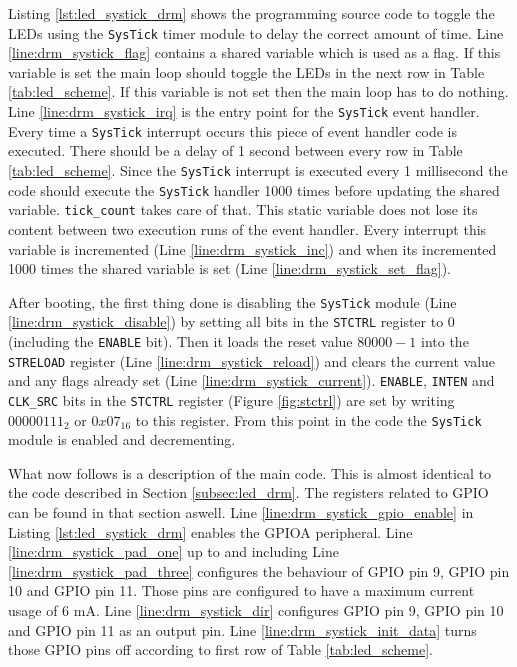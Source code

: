 Listing \ref{lst:led_systick_drm} shows the programming source code to toggle the LEDs using the \texttt{SysTick} timer module to delay the correct amount of time.
Line \ref{line:drm_systick_flag} contains a shared variable which is used as a flag. If this variable is set the main loop should toggle the LEDs in the next row in Table \ref{tab:led_scheme}. If this variable is not set then the main loop has to do nothing.
Line \ref{line:drm_systick_irq} is the entry point for the \texttt{SysTick} event handler.
Every time a \texttt{SysTick} interrupt occurs this piece of event handler code is executed.
There should be a delay of 1 second between every row in Table \ref{tab:led_scheme}. Since the \texttt{SysTick} interrupt is executed every 1 millisecond the code should execute the \texttt{SysTick} handler 1000 times before updating the shared variable.
\texttt{tick\_count} takes care of that. This static variable does not lose its content between two execution runs of the event handler.
Every interrupt this variable is incremented (Line \ref{line:drm_systick_inc}) and when its incremented 1000 times the shared variable is set (Line \ref{line:drm_systick_set_flag}). 

\newpage
After booting, the first thing done is disabling the \texttt{SysTick} module (Line \ref{line:drm_systick_disable}) by setting all bits in the \texttt{STCTRL} register to 0 (including the \texttt{\scriptsize ENABLE} bit).
Then it loads the reset value $80 000 - 1$ into the \texttt{STRELOAD} register (Line \ref{line:drm_systick_reload}) and clears the current value and any flags already set (Line \ref{line:drm_systick_current}).
\texttt{\scriptsize ENABLE}, \texttt{\scriptsize INTEN} and \texttt{\scriptsize CLK\_SRC} bits in the \texttt{STCTRL} register (Figure \ref{fig:stctrl}) are set by writing $00000111_2$ or $0x07_{16}$ to this register.
From this point in the code the \texttt{SysTick} module is enabled and decrementing.\newline

What now follows is a description of the main code. 
This is almost identical to the code described in Section \ref{subsec:led_drm}.
The registers related to GPIO can be found in that section aswell.
Line \ref{line:drm_systick_gpio_enable} in Listing \ref{lst:led_systick_drm} enables the GPIOA peripheral.
Line \ref{line:drm_systick_pad_one} up to and including Line \ref{line:drm_systick_pad_three} configures the behaviour of GPIO pin 9, GPIO pin 10 and GPIO pin 11. Those pins are configured to have a maximum current usage of 6 mA.
Line \ref{line:drm_systick_dir} configures GPIO pin 9, GPIO pin 10 and GPIO pin 11  as an output pin.
Line \ref{line:drm_systick_init_data} turns those GPIO pins off according to first row of Table \ref{tab:led_scheme}. \newline

